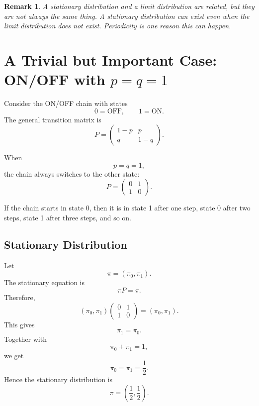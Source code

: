 \documentclass[12pt,a4paper]{article}
\theoremstyle{lecturestyle}
\newtheorem{remark}{Remark}
\begin{document}
\begin{remark}
A stationary distribution and a limit distribution are related, but they are not always the same thing. A stationary distribution can exist even when the limit distribution does not exist. Periodicity is one reason this can happen.
\end{remark}

\section{A Trivial but Important Case: ON/OFF with $p=q=1$}

Consider the ON/OFF chain with states
\[
0=\text{OFF},\qquad 1=\text{ON}.
\]
The general transition matrix is
\[
P=
\begin{pmatrix}
1-p & p\\
q & 1-q
\end{pmatrix}.
\]

When
\[
p=q=1,
\]
the chain always switches to the other state:
\[
P=
\begin{pmatrix}
0 & 1\\
1 & 0
\end{pmatrix}.
\]

\begin{center}
\end{center}

If the chain starts in state 0, then it is in state 1 after one step, state 0 after two steps, state 1 after three steps, and so on.

\subsection{Stationary Distribution}

Let
\[
\pi=(\pi_0,\pi_1).
\]
The stationary equation is
\[
\pi P=\pi.
\]
Therefore,
\[
(\pi_0,\pi_1)
\begin{pmatrix}
0 & 1\\
1 & 0
\end{pmatrix}
=
(\pi_0,\pi_1).
\]
This gives
\[
\pi_1=\pi_0.
\]
Together with
\[
\pi_0+\pi_1=1,
\]
we get
\[
\pi_0=\pi_1=\frac12.
\]
Hence the stationary distribution is
\[
\boxed{\pi=\left(\frac12,\frac12\right).}
\]
\end{document}
